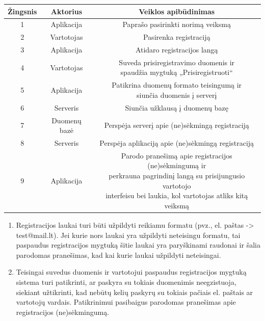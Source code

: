 \documentclass[12pt]{article}
\begin{document}
		\begin{center}
		\begin{tabular}{ | c | c | c | }
			\hline
			Žingsnis & Aktorius     & Veiklos apibūdinimas \\ \hline
			1        & Aplikacija   & Paprašo pasirinkti norimą veiksmą \\ \hline
			2        & Vartotojas   & Pasirenka registraciją \\ \hline
			3        & Aplikacija   & Atidaro registracijos langą \\ \hline
			4        & Vartotojas   & \makecell{Suveda prisiregistravimo duomenis ir \\ spaudžia mygtuką „Prisiregistruoti“} \\ \hline
			5        & Aplikacija   & \makecell{Patikrina duomenų formato teisingumą ir \\ siunčia duomenis į serverį} \\ \hline
			6        & Serveris     & Siunčia užklausą į duomenų bazę \\ \hline
			7        & Duomenų bazė & Perspėja serverį apie (ne)sėkmingą registraciją \\ \hline
			8        & Serveris     & Perspėja aplikaciją apie (ne)sėkmingą registraciją \\ \hline
			9        & Aplikacija   & \makecell{Parodo pranešimą apie registracijos (ne)sėkmingumą ir \\ perkrauna pagrindinį langą su prisijungusio vartotojo \\ interfeisu bei laukia, kol vartotojas atliks kitą veiksmą} \\ \hline
		\end{tabular}
		\bigskip
		\end{center}	
		
	\begin{enumerate}[resume, labelindent=10pt,leftmargin=2.2cm]
		\item Registracijos laukai turi būti užpildyti reikiamu formatu (pvz., el. paštas -> test@mail.lt). Jei kurie nors laukai yra užpildyti neteisingu formatu, tai paspaudus registracijos mygtuką šitie laukai yra paryškinami raudonai ir šalia parodomas pranešimas, kad kai kurie laukai užpildyti neteisingai.
		\pagebreak
		\item Teisingai suvedus duomenis ir vartotojui paspaudus registracijos mygtuką sistema turi patikrinti, ar paskyra su tokiais duomenimis neegzistuoja, siekiant užtikrinti, kad nebūtų kelių paskyrų su tokiais pačiais el. paštais ar vartotojų vardais. Patikrinimui pasibaigus parodomas pranešimas apie registracijos (ne)sėkmingumą.	
	\end{enumerate}
		
\end{document}
